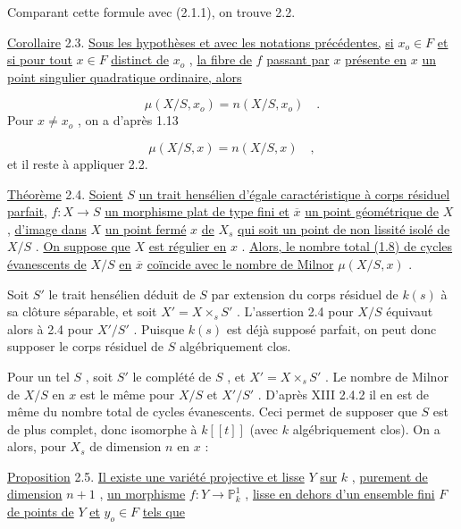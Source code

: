 
Comparant cette formule avec (2.1.1), on trouve 2.2.

\underline{Corollaire} 2.3. \underline{Sous les hypothèses et avec les notations précédentes,} \underline{si} $x_o \in F$ \underline{et si pour tout} $x \in F$ \underline{distinct de} $x_o$ , \underline{la fibre de} $f$ \underline{passant par} $x$ \underline{présente en} $x$ \underline{un point singulier quadratique ordinaire, alors}

\begin{equation*}
\mu(X/S,x_o) = n(X/S,x_o) \quad .
\end{equation*}
Pour $x \neq x_o$ , on a d'après 1.13

\begin{equation*}
\mu(X/S,x) = n(X/S,x) \quad ,
\end{equation*}
et il reste à appliquer 2.2.

\underline{Théorème} 2.4. \underline{Soient} $S$ \underline{un trait hensélien d'égale caractéristique à corps résiduel parfait,} $f : X \to S$ \underline{un morphisme plat de type fini et} $\overline{x}$ \underline{un point géométrique de} $X$ , \underline{d'image dans} $X$ \underline{un point fermé} $x$ \underline{de} $X_s$ \underline{qui soit un point de non lissité isolé de} $X/S$ . \underline{On suppose que} $X$ \underline{est régulier en} $x$ . \underline{Alors, le nombre total (1.8) de cycles évanescents de} $X/S$ \underline{en} $\overline{x}$ \underline{coïncide avec le nombre de Milnor} $\mu(X/S,x)$ .

Soit $S'$ le trait hensélien déduit de $S$ par extension du corps résiduel de $k(s)$ à sa clôture séparable, et soit $X' = X \times_s S'$ . L'assertion 2.4 pour $X/S$ équivaut alors à 2.4 pour $X'/S'$ . Puisque $k(s)$ est déjà supposé parfait, on peut donc supposer le corps résiduel de $S$ algébriquement clos.

Pour un tel $S$ , soit $S'$ le complété de $S$ , et $X' = X \times_s S'$ . Le nombre de Milnor de $X/S$ en $x$ est le même pour $X/S$ et $X'/S'$ . D'après XIII 2.4.2 il en est de même du nombre total de cycles évanescents. Ceci permet de supposer que $S$ est de plus complet, donc isomorphe à $k[[t]]$ (avec $k$ algébriquement clos). On a alors, pour $X_s$ de dimension $n$ en $x$ :

\underline{Proposition} 2.5. \underline{Il existe une variété projective et lisse} $Y$ \underline{sur} $k$ , \underline{purement de dimension} $n + 1$ , \underline{un morphisme} $f : Y \to \mathbb{P}^1_k$ , \underline{lisse en dehors d'un ensemble fini} $F$
\underline{de points de} $Y$ \underline{et} $y_o \in F$ \underline{tels que}

